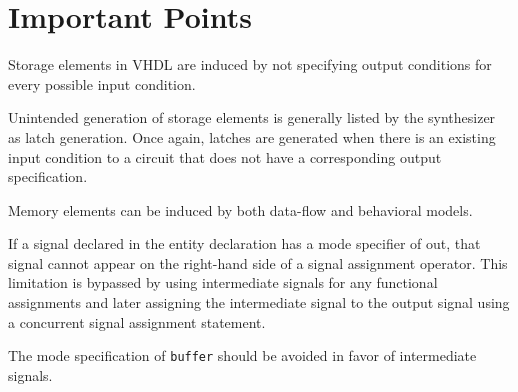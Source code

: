 \section{Important Points}
\begin{my_list}
\item Storage elements in VHDL are induced by not specifying output conditions for every possible input condition.

\item Unintended generation of storage elements is generally listed by the synthesizer as latch generation. Once again, latches are generated when there is an existing input condition to a circuit that does not have a corresponding output specification.

\item Memory elements can be induced by both data-flow and behavioral models.

\item If a signal declared in the entity declaration has a mode specifier of out, that signal cannot appear on the right-hand side of a signal assignment operator. This limitation is bypassed by using intermediate signals for any functional assignments and later assigning the intermediate signal to the output signal using a concurrent signal assignment statement.

\item The mode specification of \texttt{buffer} should be avoided in favor of intermediate signals.
\end{my_list}

